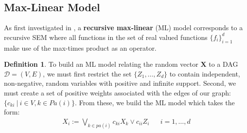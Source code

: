 \documentclass[12pt]{article}
\newcommand{\ds}{\displaystyle}
\theoremstyle{definition}
\theoremstyle{definition}
\newtheorem{definition}{Definition}
\begin{document}
\subsection{Max-Linear Model}
As first investigated in \cite{mlmodels}, a \textbf{recursive max-linear} (ML) model corresponds to a recursive SEM where all functions in the set of real valued functions $\ds \{f_i\}_{i=1}^d$ make use of the max-times product as an operator.
\begin{definition} To build an ML model relating the random vector $\mathbf{X}$ to a DAG $\mathcal{D}=(V,E)$, we must first restrict the set $\{Z_1,\hdots, Z_d\}$ to contain independent, non-negative, random variables with positive and infinite support. Second, we must create a set of positive weights associated with the edges of our graph: $\ds \{c_{ki}\ |\ i \in V , k \in Pa(i)\}$. From these, we build the ML model which takes the form:
\begin{align*}
    X_i:= \bigvee_{k\in pa(i)}c_{ki}X_k \vee c_{ii}Z_i&& i=1,\hdots,d \tag{1}
\end{align*}
\end{definition}
\end{document}
